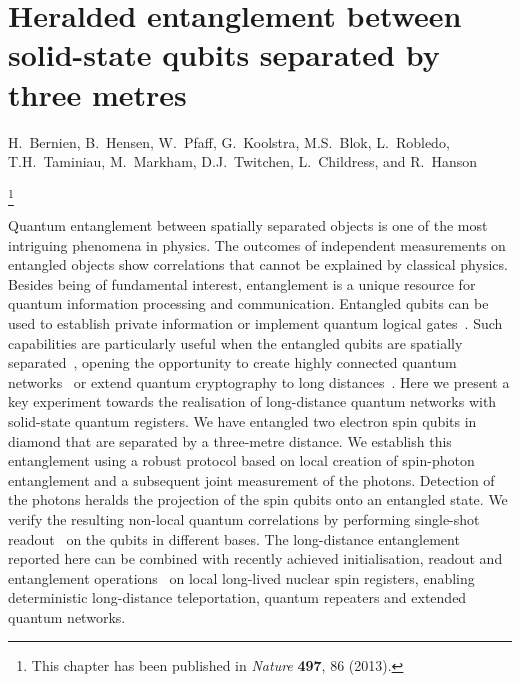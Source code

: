 \graphicspath{{./ch_LDE/figures/}}

\chapter[Heralded entanglement between solid-state qubits separated by three metres]{Heralded entanglement between solid-state qubits separated by three metres}
\label{ch:LDE}

\begin{center} 
    \vspace{-1cm} {H.~Bernien, B.~Hensen, W.~Pfaff, G.~Koolstra, M.S.~Blok, L.~Robledo, T.H.~Taminiau, M.~Markham, D.J.~Twitchen, L.~Childress, and R.~Hanson} 
\end{center}

{\renewcommand{\thefootnote}{}\footnote{This chapter has been published in
    {\em Nature} \textbf{497}, 86 (2013).}}

\vspace{-0.5cm} 
Quantum entanglement between spatially separated objects is one of the most intriguing phenomena in physics. The outcomes of independent measurements on entangled objects show correlations that cannot be explained by classical physics. Besides being of fundamental interest, entanglement is a unique resource for quantum information processing and communication. Entangled qubits can be used to establish private information or implement quantum logical gates~\cite{Nielsen2000,Raussendorf2001}. Such capabilities are particularly useful when the entangled qubits are spatially separated~\cite{Moehring2007,Ritter2012,Hofmann2012}, opening the opportunity to create highly connected quantum networks~\cite{Kimble2008} or extend quantum cryptography to long distances~\cite{Duan2001,Childress2006a}. Here we present a key experiment towards the realisation of long-distance quantum networks with solid-state quantum registers. We have entangled two electron spin qubits in diamond that are separated by a three-metre distance. We establish this entanglement using a robust protocol based on local creation of spin-photon entanglement and a subsequent joint measurement of the photons. Detection of the photons heralds the projection of the spin qubits onto an entangled state. We verify the resulting non-local quantum correlations by performing single-shot readout~\cite{Robledo2011} on the qubits in different bases. The long-distance entanglement reported here can be combined with recently achieved initialisation, readout and entanglement operations~\cite{Robledo2011,Neumann2010a,Neumann2008,Maurer2012,Pfaff2012} on local long-lived nuclear spin registers, enabling deterministic long-distance teleportation, quantum repeaters and extended quantum networks.

